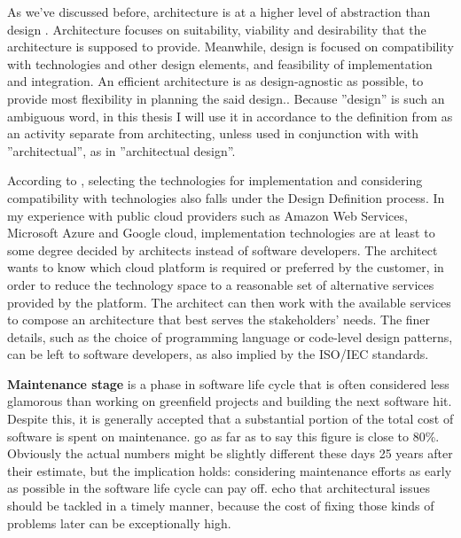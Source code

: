 \documentclass[utf8,english]{gradu3}
\begin{document}
As we've discussed before, architecture is at a higher level of abstraction than
design \parencite{IEEE12207}. Architecture focuses on suitability, viability and
desirability that the architecture is supposed to provide. Meanwhile, design is
focused on compatibility with technologies and other design elements, and
feasibility of implementation and integration. An efficient architecture is as
design-agnostic as possible, to provide most flexibility in planning the said
design.\parencite[71]{IEEE12207}. Because ''design'' is such an ambiguous word, in this
thesis I will use it in accordance to the definition from \textcite{IEEE12207} as an activity
separate from architecting, unless used in conjunction with with ''architectual'',
as in ''architectual design''.

According to \textcite[71-72]{IEEE12207}, selecting the technologies for implementation
and considering compatibility with technologies also falls under the Design
Definition process. In my experience with public cloud providers such as Amazon
Web Services, Microsoft Azure and Google cloud, implementation technologies are
at least to some degree decided by architects instead of software developers.
The architect wants to know which cloud platform is required or preferred by the
customer, in order to reduce the technology space to a reasonable set of
alternative services provided by the platform. The architect can then work with
the available services to compose an architecture that best serves the
stakeholders' needs. The finer details, such as the choice of programming
language or code-level design patterns, can be left to software developers, as
also implied by the ISO/IEC standards.

\textbf{Maintenance stage} is a phase in software life cycle that is often considered
less glamorous than working on greenfield projects and building the next
software hit. Despite this, it is generally accepted that a substantial portion
of the total cost of software is spent on maintenance. \textcite[32]{Bass1998} go as far
as to say this figure is close to 80\%. Obviously the actual numbers might be
slightly different these days 25 years after their estimate, but the implication
holds: considering maintenance efforts as early as possible in the software life
cycle can pay off. \textcite[1]{Mumtaz2021} echo that architectural issues should be
tackled in a timely manner, because the cost of fixing those kinds of problems
later can be exceptionally high.
\end{document}
